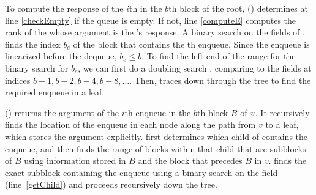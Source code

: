 To compute the response of the $i$th  in the $b$th block
of the root, () determines at line \ref{checkEmpty} if the queue is empty.
If not, line \ref{computeE} computes the rank  of the
 whose argument is the 's response. 
A binary search on the  fields of . finds the index $b_e$ of the block that contains 
the th enqueue.
Since the enqueue is linearized before the dequeue, $b_e\leq b$.  To find the left end of the range for the binary search for $b_e$, we can first do a doubling search \cite{BY76}, comparing  to the  fields at indices $b-1, b-2, b-4, b-8, \ldots$.
Then,  traces down through the tree to find the required enqueue in a leaf.

() returns the argument of the
$i$th enqueue in the $b$th block $B$ of  $\mbox{\textnormal{\textit{v}}}$. 
It recursively finds the location of the enqueue in each node along the path from $v$ to a leaf, which stores the argument explicitly.
 first determines which child of  contains the enqueue, and
then finds the range of blocks within that child that are subblocks of $B$ using information stored
in $B$ and the block that precedes $B$ in $v$.
 finds the exact subblock containing the enqueue using a binary search on the 
field (line~\ref{getChild}) and proceeds recursively down the tree.



